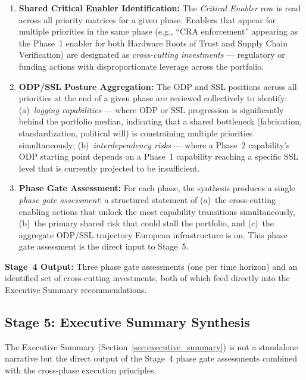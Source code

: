 \documentclass{ieeeaccess}
\begin{document}
\begin{enumerate}
    \item \textbf{Shared Critical Enabler Identification:}
    The \emph{Critical Enabler} row is read across all priority matrices for
    a given phase. Enablers that appear for multiple priorities in the same
    phase (e.g., ``CRA enforcement'' appearing as the Phase~1 enabler for both
    Hardware Roots of Trust and Supply Chain Verification) are designated as
    \emph{cross-cutting investments} --- regulatory or funding actions with
    disproportionate leverage across the portfolio.

    \item \textbf{ODP/SSL Posture Aggregation:}
    The ODP and SSL positions across all priorities at the end of a given
    phase are reviewed collectively to identify:
    (a)~\emph{lagging capabilities} --- where ODP or SSL progression is
    significantly behind the portfolio median, indicating that a shared
    bottleneck (fabrication, standardization, political will) is constraining
    multiple priorities simultaneously;
    (b)~\emph{interdependency risks} --- where a Phase~2 capability's ODP
    starting point depends on a Phase~1 capability reaching a specific SSL
    level that is currently projected to be insufficient.

    \item \textbf{Phase Gate Assessment:}
    For each phase, the synthesis produces a single \emph{phase gate
    assessment}: a structured statement of (a)~the cross-cutting enabling
    actions that unlock the most capability transitions simultaneously,
    (b)~the primary shared risk that could stall the portfolio, and
    (c)~the aggregate ODP/SSL trajectory European infrastructure is on. This
    phase gate assessment is the direct input to Stage~5.
\end{enumerate}

\noindent\textbf{Stage~4 Output:} Three phase gate assessments (one per time
horizon) and an identified set of cross-cutting investments, both of which
feed directly into the Executive Summary recommendations.

\subsection{Stage 5: Executive Summary Synthesis}
\label{sec:exec}
The Executive Summary (Section~\ref{sec:executive_summary}) is not a
standalone narrative but the direct output of the Stage~4 phase gate
assessments combined with the cross-phase execution principles.
\end{document}
